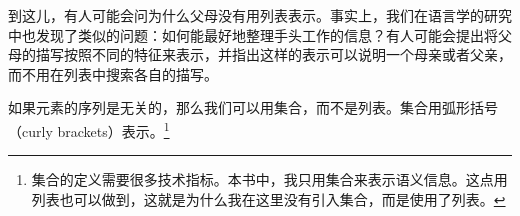 \ea
{}
\z
\vspace{-\baselineskip}
到这儿，有人可能会问为什么父母没有用列表表示。事实上，我们在语言学的研究中也发现了类似的问题：如何能最好地整理手头工作的信息？有人可能会提出将父母的描写按照不同的特征来表示，并指出这样的表示可以说明一个母亲或者父亲，而不用在列表中搜索各自的描写。

如果元素的序列是无关的，那么我们可以用集合，而不是列表。集合用弧形括号（curly brackets）表示。\footnote{%
集合的定义需要很多技术指标。本书中，我只用集合来表示语义信息。这点用列表也可以做到，这就是为什么我在这里没有引入集合，而是使用了列表。
}

